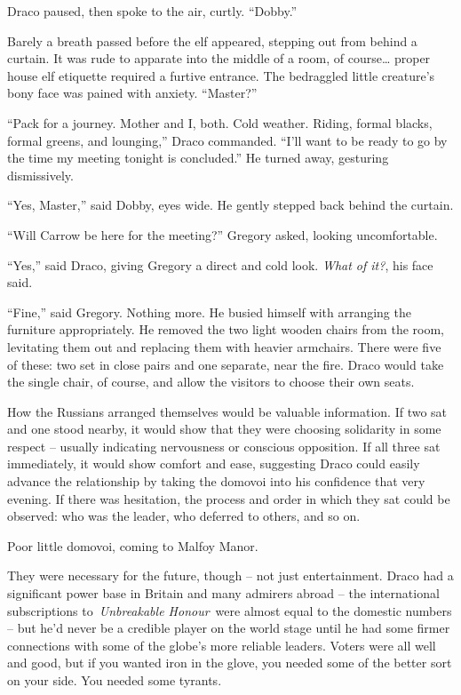 Draco paused, then spoke to the air, curtly. ``Dobby.''

Barely a breath passed before the elf appeared, stepping out from behind
a curtain. It was rude to apparate into the middle of a room, of
course\ldots{} proper house elf etiquette required a furtive entrance.
The bedraggled little creature's bony face was pained with anxiety.
``Master?''

``Pack for a journey. Mother and I, both. Cold weather. Riding, formal
blacks, formal greens, and lounging,'' Draco commanded. ``I'll want to
be ready to go by the time my meeting tonight is concluded.'' He turned
away, gesturing dismissively.

``Yes, Master,'' said Dobby, eyes wide. He gently stepped back behind
the curtain.

``Will Carrow be here for the meeting?'' Gregory asked, looking
uncomfortable.

``Yes,'' said Draco, giving Gregory a direct and cold look. \emph{What
of it?}, his face said.

``Fine,'' said Gregory. Nothing more. He busied himself with arranging
the furniture appropriately. He removed the two light wooden chairs from
the room, levitating them out and replacing them with heavier armchairs.
There were five of these: two set in close pairs and one separate, near
the fire. Draco would take the single chair, of course, and allow the
visitors to choose their own seats.

How the Russians arranged themselves would be valuable information. If
two sat and one stood nearby, it would show that they were choosing
solidarity in some respect -- usually indicating nervousness or
conscious opposition. If all three sat immediately, it would show
comfort and ease, suggesting Draco could easily advance the relationship
by taking the domovoi into his confidence that very evening. If there
was hesitation, the process and order in which they sat could be
observed: who was the leader, who deferred to others, and so on.

Poor little domovoi, coming to Malfoy Manor.

They were necessary for the future, though -- not just entertainment.
Draco had a significant power base in Britain and many admirers abroad
-- the international subscriptions to~\emph{Unbreakable Honour}~were
almost equal to the domestic numbers -- but he'd never be a credible
player on the world stage until he had some firmer connections with some
of the globe's more reliable leaders. Voters were all well and good, but
if you wanted iron in the glove, you needed some of the better sort on
your side. You needed some tyrants.

